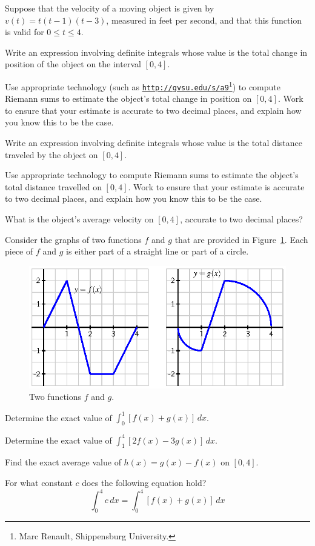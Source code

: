\begin{exercises}
  \item Suppose that the velocity of a moving object is given by $v(t) = t(t-1)(t-3)$, measured in feet per second, and that this function is valid for $0 \le t \le 4$.
  	\ba
		\item Write an expression involving definite integrals whose value is the total change in position of the object on the interval $[0,4]$.
		\item Use appropriate technology (such as \href{http://gvsu.edu/s/av}{\texttt{http://gvsu.edu/s/a9}}\footnote{Marc Renault, Shippensburg University.}) to compute Riemann sums to estimate the object's total change in position on $[0,4]$.  Work to ensure that your estimate is accurate to two decimal places, and explain how you know this to be the case.
		\item Write an expression involving definite integrals whose value is the total distance traveled by the object on $[0,4]$.
		\item Use appropriate technology to compute Riemann sums to estimate the object's total distance travelled on $[0,4]$.  Work to ensure that your estimate is accurate to two decimal places, and explain how you know this to be the case.
		\item What is the object's average velocity on $[0,4]$, accurate to two decimal places?
	\ea
  
        \item Consider the graphs of two functions $f$ and $g$ that are provided in Figure~\ref{F:4.3.Ez2}.  Each piece of $f$ and $g$ is either part of a straight line or part of a circle.
\begin{figure}[h]
\begin{center}
\includegraphics{figures/4_3_Ez2.eps}
\caption{Two functions $f$ and $g$.} \label{F:4.3.Ez2}
\end{center}
\end{figure} 
  \ba
  	\item Determine the exact value of $\int_0^1 [f(x) + g(x)]\,dx$.
	\item Determine the exact value of $\int_1^4 [2f(x) - 3g(x)] \, dx$.
	\item Find the exact average value of $h(x) = g(x) - f(x)$ on $[0,4]$.
	\item For what constant $c$ does the following equation hold?
	$$\int_0^4 c \, dx = \int_0^4 [f(x) + g(x)] \, dx$$
  \ea
  

\end{exercises}
